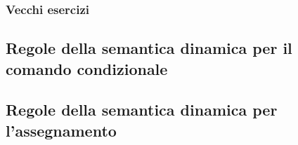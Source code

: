 \documentclass[a4paper]{article}
\begin{document}
	\subsubsection{Vecchi esercizi}
	
	\subsection{Regole della semantica dinamica per il comando condizionale}
	
	
	\subsection{Regole della semantica dinamica per l'assegnamento}
	
\end{document}
